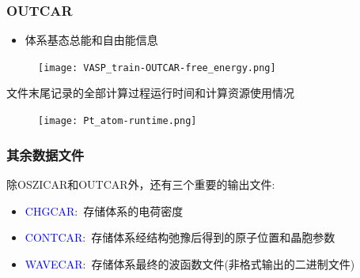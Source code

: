 \frame
{
	\frametitle{\textrm{OUTCAR}}
	\begin{itemize}
	\item 体系基态总能和自由能信息
	\end{itemize}
\begin{figure}[h!]
\centering
\texttt{[image: VASP\_train-OUTCAR-free\_energy.png]}
\caption{\fontsize{6.2pt}{5.2pt}}%
\label{VASP_train-OUTCAR-free_energy}
\end{figure}
%
文件末尾记录的全部计算过程运行时间和计算资源使用情况%
\begin{figure}[h!]
\centering
\vskip -2pt
\texttt{[image: Pt\_atom-runtime.png]}
\caption{\fontsize{6.2pt}{5.2pt}}%
\label{Pt_atom:runtime}
\end{figure}
}

\frame
{
	\frametitle{其余数据文件}
	除\textrm{OSZICAR}和\textrm{OUTCAR}外，还有三个重要的输出文件:~
	\begin{itemize}
		\item \textcolor{blue}{\textrm{CHGCAR}}:~存储体系的电荷密度
		\item \textcolor{blue}{\textrm{CONTCAR}}:~存储体系经结构弛豫后得到的原子位置和晶胞参数
		\item \textcolor{blue}{\textrm{WAVECAR}}:~存储体系最终的波函数文件(非格式输出的二进制文件)
	\end{itemize}
}

